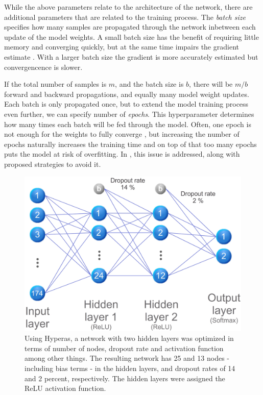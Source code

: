 While the above parameters relate to the architecture of the network, there are additional parameters that are related to the training process. The \emph{batch size} specifies how many samples are propagated through the network inbetween each update of the model weights. A small batch size has the benefit of requiring little memory and converging quickly, but at the same time impairs the gradient estimate \citep{brownlee_2017}. With a larger batch size the gradient is more accurately estimated but convergencence is slower. 

If the total number of samples is $m$, and the batch size is $b$, there will be $m/b$ forward and backward propagations, and equally many model weight updates. Each batch is only propagated once, but to extend the model training process even further, we can specify number of \emph{epochs}. This hyperparameter determines how many times each batch will be fed through the model. Often, one epoch is not enough for the weights to fully converge \citep{kriesel_2007}, but increasing the number of epochs naturally increases the training time and on top of that too many epochs puts the model at risk of overfitting. In \citep{prechelt_2000}, this issue is addressed, along with proposed strategies to avoid it.

\begin{figure}[h]
	\centering
	\includegraphics[scale=0.5]{figs_temp/optimized_network_graph.jpg}
	\caption{Using Hyperas, a network with two hidden layers was optimized in terms of number of nodes, dropout rate and activation function among other things. The resulting network has 25 and 13 nodes - including bias terms - in the hidden layers, and dropout rates of 14 and 2 percent, respectively. The hidden layers were assigned the ReLU activation function.}
	\label{fig:opt_net}
\end{figure}

